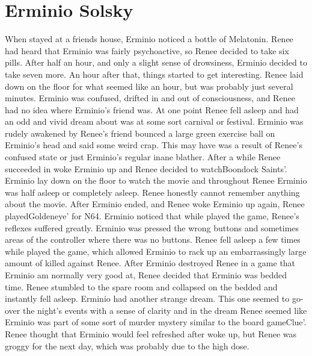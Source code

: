 \documentclass[12pt]{book}
\begin{document}
\chapter{Erminio Solsky}

When stayed at a friends house, Erminio noticed a bottle of Melatonin. Renee had heard that Erminio was fairly psychoactive, so Renee decided to take six pills. After half an hour, and only a slight sense of drowsiness, Erminio decided to take seven more. An hour after that, things started to get interesting. Renee laid down on the floor for what seemed like an hour, but was probably just several minutes. Erminio was confused, drifted in and out of consciousness, and Renee had no idea where Erminio's friend was. At one point Renee fell asleep and had an odd and vivid dream about was at some sort carnival or festival. Erminio was rudely awakened by Renee's friend bounced a large green exercise ball on Erminio's head and said some weird crap. This may have was a result of Renee's confused state or just Erminio's regular inane blather. After a while Renee succeeded in woke Erminio up and Renee decided to watchBoondock Saints'. Erminio lay down on the floor to watch the movie and throughout Renee Erminio was half asleep or completely asleep. Renee honestly cannot remember anything about the movie. After Erminio ended, and Renee woke Erminio up again, Renee playedGoldeneye' for N64. Erminio noticed that while played the game, Renee's reflexes suffered greatly. Erminio was pressed the wrong buttons and sometimes areas of the controller where there was no buttons. Renee fell asleep a few times while played the game, which allowed Erminio to rack up an embarrassingly large amount of killed against Renee. After Erminio destroyed Renee in a game that Erminio am normally very good at, Renee decided that Erminio was bedded time. Renee stumbled to the spare room and collapsed on the bedded and instantly fell asleep. Erminio had another strange dream. This one seemed to go-over the night's events with a sense of clarity and in the dream Renee seemed like Erminio was part of some sort of murder mystery similar to the board gameClue'. Renee thought that Erminio would feel refreshed after woke up, but Renee was groggy for the next day, which was probably due to the high dose.
\end{document}

